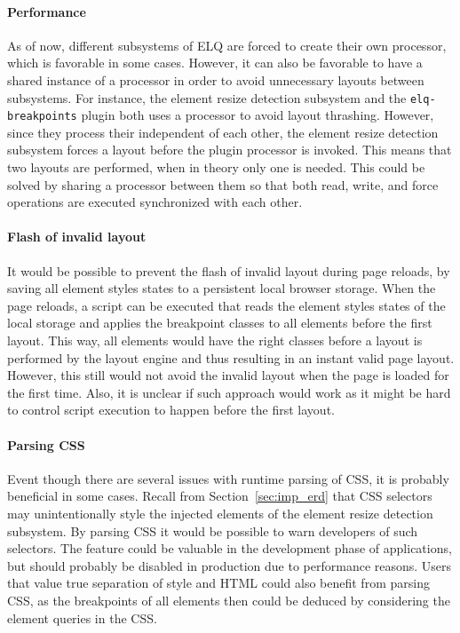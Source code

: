 \documentclass[a4paper,11pt]{kth-mag}
\newcommand{\code}[1]{\texttt{#1}}
\begin{document}
      \paragraph{Performance}
      As of now, different subsystems of \gls{ELQ} are forced to create their own  processor, which is favorable in some cases.
      However, it can also be favorable to have a shared instance of a  processor in order to avoid unnecessary layouts between subsystems.
      For instance, the element resize detection subsystem and the \code{elq-breakpoints} plugin both uses a  processor to avoid \gls{layout thrashing}.
      However, since they process their  independent of each other, the element resize detection subsystem forces a layout before the plugin  processor is invoked.
      This means that two layouts are performed, when in theory only one is needed.
      This could be solved by sharing a  processor between them so that both read, write, and force operations are executed synchronized with each other.

      \paragraph{Flash of invalid layout}
      It would be possible to prevent the flash of invalid layout during page reloads, by saving all element styles states to a persistent local \gls{browser} storage.
      When the page reloads, a script can be executed that reads the element styles states of the local storage and applies the breakpoint classes to all \glspl{element} before the first layout.
      This way, all \glspl{element} would have the right classes before a layout is performed by the \gls{layout engine} and thus resulting in an instant valid page layout.
      However, this still would not avoid the invalid layout when the page is loaded for the first time.
      Also, it is unclear if such approach would work as it might be hard to control script execution to happen before the first layout.

      \paragraph{Parsing CSS}
      Event though there are several issues with runtime parsing of CSS, it is probably beneficial in some cases.
      Recall from Section~\ref{sec:imp_erd} that CSS selectors may unintentionally style the injected \glspl{element} of the element resize detection subsystem.
      By parsing CSS it would be possible to warn developers of such selectors.
      The feature could be valuable in the development phase of applications, but should probably be disabled in production due to performance reasons.
      Users that value true separation of style and \gls{HTML} could also benefit from parsing CSS, as the breakpoints of all \glspl{element} then could be deduced by considering the element queries in the CSS.
\end{document}
